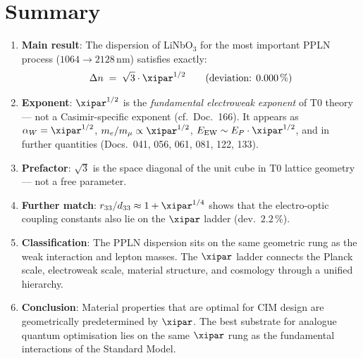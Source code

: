 \clearpage

\section{Summary}
\label{sec:summary}

\begin{enumerate}

    \item \textbf{Main result}: The dispersion of LiNbO$_3$ for the most
    important PPLN process ($1064 \to 2128\,\text{nm}$) satisfies exactly:
    \[
        \Delta n \;=\; \sqrt{3}\cdot\xipar^{1/2}
        \qquad (\text{deviation: } 0.000\,\%)
    \]

    \item \textbf{Exponent}: $\xipar^{1/2}$ is the \emph{fundamental
    electroweak exponent} of T0 theory — not a Casimir-specific exponent
    (cf.\ Doc.~166). It appears as $\alpha_W = \xipar^{1/2}$,
    $m_e/m_\mu \propto \xipar^{1/2}$, $E_\mathrm{EW} \sim E_P\cdot\xipar^{1/2}$,
    and in further quantities (Docs.~041, 056, 061, 081, 122, 133).

    \item \textbf{Prefactor}: $\sqrt{3}$ is the space diagonal of the unit
    cube in T0 lattice geometry — not a free parameter.

    \item \textbf{Further match}: $r_{33}/d_{33} \approx 1 + \xipar^{1/4}$
    shows that the electro-optic coupling constants also lie on the $\xipar$
    ladder (dev.\ $2.2\,\%$).

    \item \textbf{Classification}: The PPLN dispersion sits on the same
    geometric rung as the weak interaction and lepton masses. The $\xipar$
    ladder connects the Planck scale, electroweak scale, material structure,
    and cosmology through a unified hierarchy.

    \item \textbf{Conclusion}: Material properties that are optimal for CIM
    design are geometrically predetermined by $\xipar$. The best substrate
    for analogue quantum optimisation lies on the same $\xipar$ rung as
    the fundamental interactions of the Standard Model.

\end{enumerate}


